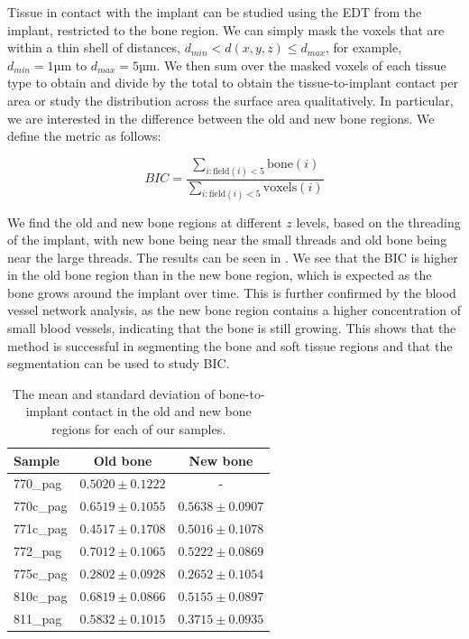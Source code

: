 Tissue in contact with the implant can be studied using the EDT from the
implant, restricted to the bone region. We can simply mask the voxels that are
within a thin shell of distances, $d_{min} < d(x,y,z) \le d_{max}$, for
example, $d_{min} = 1 \text{µm}$ to $d_{max} = 5 \text{µm}$. We then sum over
the masked voxels of each tissue type to obtain and divide by the total to
obtain the tissue-to-implant contact per area or study the distribution across
the surface area qualitatively. In particular, we are interested in the
difference between the old and new bone regions. We define the metric as
follows:

\begin{equation}
    BIC = \frac{\sum_{i : \text{field}(i) < 5} \text{bone}(i)}{\sum_{i : \text{field}(i) < 5} \text{voxels}(i)}
\end{equation}

We find the old and new bone regions at different $z$ levels, based on the
threading of the implant, with new bone being near the small threads and old
bone being near the large threads. The results can be seen in .
We see that the BIC is higher in the old bone region than in the new bone
region, which is expected as the bone grows around the implant over time. This
is further confirmed by the blood vessel network analysis, as the new bone
region contains a higher concentration of small blood vessels, indicating that
the bone is still growing. This shows that the method is successful in
segmenting the bone and soft tissue regions and that the segmentation can be
used to study BIC.

\begin{table}
    \caption{The mean and standard deviation of bone-to-implant contact in the old and new bone regions for each of our samples.}
    \label{tab:bic}
    \centering
    \begin{tabular}{lcc}
        \toprule
        Sample & Old bone & New bone \\
        \midrule
        770\_pag & $0.5020 \pm 0.1222$ & - \\
        770c\_pag & $0.6519 \pm 0.1055$ & $0.5638 \pm 0.0907$ \\
        771c\_pag & $0.4517 \pm 0.1708$ & $0.5016 \pm 0.1078$ \\
        772\_pag & $0.7012 \pm 0.1065$ & $0.5222 \pm 0.0869$ \\
        775c\_pag & $0.2802 \pm 0.0928$ & $0.2652 \pm 0.1054$ \\
        810c\_pag & $0.6819 \pm 0.0866$ & $0.5155 \pm 0.0897$ \\
        811\_pag & $0.5832 \pm 0.1015$ & $0.3715 \pm 0.0935$ \\
        \bottomrule
    \end{tabular}
\end{table}

